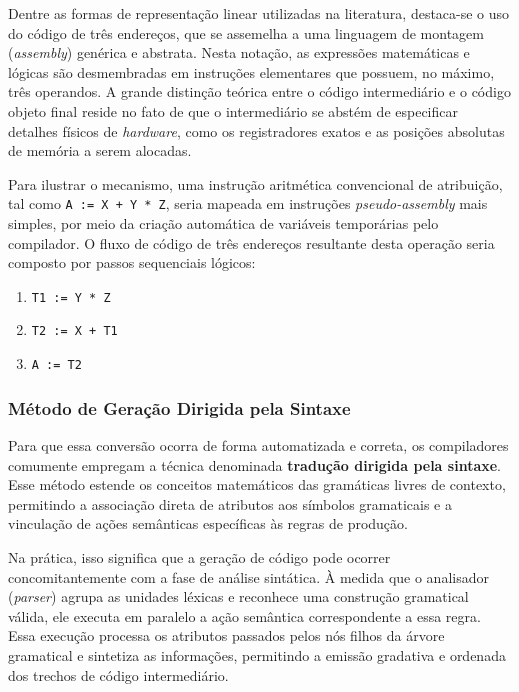 Dentre as formas de representação linear utilizadas na literatura, destaca-se o uso do código de três endereços, que se assemelha a uma linguagem de montagem (\textit{assembly}) genérica e abstrata. Nesta notação, as expressões matemáticas e lógicas são desmembradas em instruções elementares que possuem, no máximo, três operandos. A grande distinção teórica entre o código intermediário e o código objeto final reside no fato de que o intermediário se abstém de especificar detalhes físicos de \textit{hardware}, como os registradores exatos e as posições absolutas de memória a serem alocadas.

Para ilustrar o mecanismo, uma instrução aritmética convencional de atribuição, tal como \texttt{A := X + Y * Z}, seria mapeada em instruções \textit{pseudo-assembly} mais simples, por meio da criação automática de variáveis temporárias pelo compilador. O fluxo de código de três endereços resultante desta operação seria composto por passos sequenciais lógicos:
\begin{enumerate}
    \item \texttt{T1 := Y * Z}
    \item \texttt{T2 := X + T1}
    \item \texttt{A := T2}
\end{enumerate}

\subsubsection*{Método de Geração Dirigida pela Sintaxe}

Para que essa conversão ocorra de forma automatizada e correta, os compiladores comumente empregam a técnica denominada \textbf{tradução dirigida pela sintaxe}. Esse método estende os conceitos matemáticos das gramáticas livres de contexto, permitindo a associação direta de atributos aos símbolos gramaticais e a vinculação de ações semânticas específicas às regras de produção.

Na prática, isso significa que a geração de código pode ocorrer concomitantemente com a fase de análise sintática. À medida que o analisador (\textit{parser}) agrupa as unidades léxicas e reconhece uma construção gramatical válida, ele executa em paralelo a ação semântica correspondente a essa regra. Essa execução processa os atributos passados pelos nós filhos da árvore gramatical e sintetiza as informações, permitindo a emissão gradativa e ordenada dos trechos de código intermediário.

